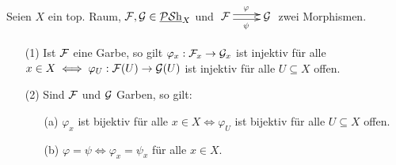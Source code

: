 \begin{prop}
\label{prop:charakterisierung-morphismen-halme}
Seien $X$ ein top. Raum, $\mathcal{F}, \mathcal{G} \in \operatorname{\underline{\mathcal{PS}h}}_{X}$ und $\xymatrix{\sheaf{F} \ar^{\varphi}@<+.5ex>[r] \ar_{\psi}@<-.5ex>[r] & \sheaf{G}}$ zwei Morphismen.
\begin{enumerate}
	\item[(1)] Ist $\mathcal{F}$ eine Garbe, so gilt $\varphi_{x} : \mathcal{F}_{x} \to \mathcal{G}_{x}$ ist injektiv für alle $x \in X \iff \varphi_{U} : \mathcal{F}(U) \to \mathcal{G}(U)$ ist injektiv für alle $U \subseteq X$ offen.
	\item[(2)] Sind $\mathcal{F}$ und $\mathcal{G}$ Garben, so gilt:
	\begin{enumerate}
		\item[(a)] $\varphi_{x}$ ist bijektiv für alle $x \in X \iff \varphi_{U}$ ist bijektiv für alle $U \subseteq X$ offen.
		\item[(b)] $\varphi = \psi \iff \varphi_{x} = \psi_{x}$ für alle $x \in X$.
	\end{enumerate}
\end{enumerate}
\end{prop}
